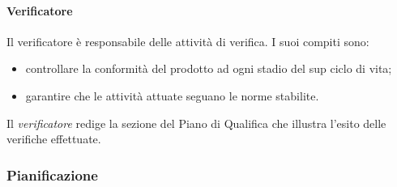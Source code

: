 \paragraph{Verificatore}
Il verificatore è responsabile delle attività di verifica.
I suoi compiti sono:
\begin{itemize}
	\item controllare la conformità del prodotto ad ogni stadio del sup ciclo di vita;
	\item garantire che le attività attuate seguano le norme stabilite.
\end{itemize}
Il \emph{verificatore} redige la sezione del Piano di Qualifica che illustra l'esito delle verifiche effettuate.


\subsubsection{Pianificazione}
